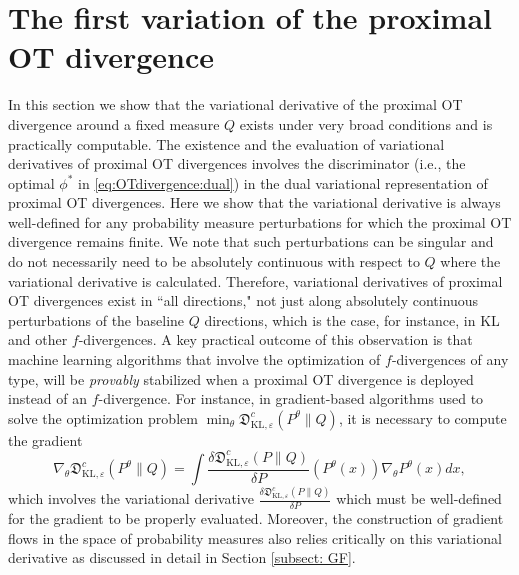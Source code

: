 \documentclass{amsart}
\newcommand{\BZ}[1]{\textcolor{olive}{BZ: #1}}
\newcommand{\MK}[1]{\textcolor{orange}{MK: #1}}
\theoremstyle{definition}
\theoremstyle{remark}
\numberwithin{equation}{section}
\begin{document}
\section{The first variation of the proximal OT divergence} \label{sec:first_variation}
 In this section we show that the variational derivative of the proximal OT divergence around a fixed  measure $Q$ exists under very broad conditions and is practically computable. The existence and the evaluation of  variational derivatives of proximal OT divergences
involves the discriminator (i.e., the optimal $\phi^*$ in \eqref{eq:OTdivergence:dual}) in the dual variational representation of proximal OT divergences.  Here we show that the variational derivative  is always well-defined for any probability measure
perturbations for which the proximal OT divergence remains finite.
We note that such perturbations can be singular and do not necessarily need to be absolutely continuous with respect to $Q$ where the variational derivative is calculated.
Therefore, variational derivatives of proximal OT divergences exist  in ``all directions," not just along absolutely continuous perturbations of the baseline $Q$ directions, which is the case, for instance, in KL and other $f$-divergences. A key practical outcome of this observation is that machine learning algorithms that involve the optimization of $f$-divergences of any type,  will be \emph{provably} stabilized when a proximal OT divergence is deployed instead of an $f$-divergence. For instance, in gradient-based algorithms used to solve the optimization problem $\min_{\theta}\mathfrak{D}_{\mathrm{KL},\varepsilon}^{c}(P^{\theta}\|Q)$, it is necessary to compute the gradient
\[
\nabla_\theta \mathfrak{D}_{\mathrm{KL},\varepsilon}^{c}(P^{\theta}\|Q)=\int\frac{\delta \mathfrak{D}_{\mathrm{KL},\varepsilon}^{c}(P\|Q)}{\delta P}(P^{\theta}(x))\nabla_\theta P^{\theta}(x)dx,
\]
which involves the variational derivative $\frac{\delta \mathfrak{D}_{\mathrm{KL},\varepsilon}^{c}(P\|Q)}{\delta P}$ which must be well-defined for the gradient to be properly evaluated. Moreover, the construction of gradient flows in the space of probability measures also relies critically on this variational derivative as discussed in detail in Section \ref{subsect: GF}.




\end{document}
